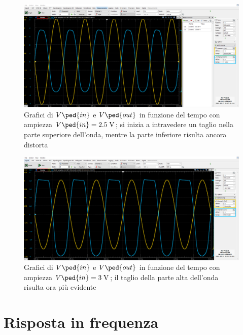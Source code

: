 \documentclass[10pt, a4paper, italian]{article}
\begin{document}
\begin{figure}[htbp]
    \centering
	\includegraphics[scale=0.4]{amp.2500}
    \caption{Grafici di $V\ped{in}$ e $V\ped{out}$ in funzione del tempo con ampiezza $V\ped{in}=2.5 \; \si{\V}$; si inizia a intravedere un taglio nella parte superiore dell'onda, mentre la parte inferiore risulta ancora distorta}
\end{figure}
\begin{figure}[htbp]
    \centering
	\includegraphics[scale=0.4]{amp.3000}
    \caption{Grafici di $V\ped{in}$ e $V\ped{out}$ in funzione del tempo con ampiezza $V\ped{in}= 3 \; \si{\V}$; il taglio della parte alta dell'onda risulta ora più evidente}
\end{figure}

\section{Risposta in frequenza}
\end{document}
